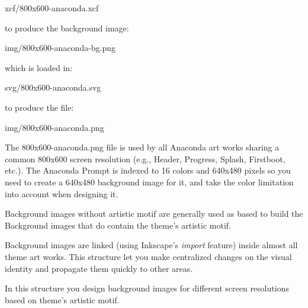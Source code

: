     xcf/800x600-anaconda.xcf

to produce the background image:

    img/800x600-anaconda-bg.png

which is loaded in: 

    svg/800x600-anaconda.svg

to produce the file:

    img/800x600-anaconda.png

The 800x600-anaconda.png file is used by all Anaconda art works
sharing a common 800x600 screen resolution (e.g., Header, Progress,
Splash, Firstboot, etc.). The Anaconda Prompt is indexed to 16 colors
and 640x480 pixels so you need to create a 640x480 background image
for it, and take the color limitation into account when designing it.

Background images without artistic motif are generally used as based
to build the Background images that do contain the theme's artistic
motif. 

Background images are linked (using Inkscape's \textit{import}
feature) inside almost all theme art works. This structure let you
make centralized changes on the visual identity and propagate them
quickly to other areas. 

In this structure you design background images for different screen
resolutions based on theme's artistic motif.

